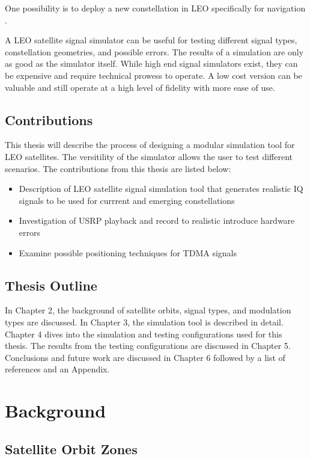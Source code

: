 \documentclass[12pt]{report}
\begin{document}
One possibility is to deploy a new constellation in LEO specifically for navigation  \cite{reidSatelliteNavigationAge2020}.


A LEO satellite signal simulator can be useful for testing different signal types, constellation geometries, and possible errors. The results of a simulation are only as good as the simulator itself. While high end signal simulators exist, they can be expensive and require technical prowess to operate. A low cost version can be valuable and still operate at a high level of fidelity with more ease of use. 

\section { Contributions}
This thesis will describe the process of designing a modular simulation tool for LEO satellites. The versitility of the simulator allows the user to test different scenarios. 
The contributions from this thesis are listed below:
\begin{itemize}
    \item Description of LEO satellite signal simulation tool that generates realistic IQ signals to be used for currrent and emerging constellations
    \item Investigation of USRP playback and record to realistic introduce hardware errors
    \item Examine possible positioning techniques for TDMA signals
    
\end{itemize}

\section{Thesis Outline}
In Chapter 2, the background of satellite orbits, signal types, and modulation types are discussed. In Chapter 3, the simulation tool is described in detail. Chapter 4 dives into the simulation and testing configurations used for this thesis. The results from the testing configurations are discussed in Chapter 5. Conclusions and future work are discussed in Chapter 6 followed by a list of references and an Appendix.


\chapter{Background}

\section{Satellite Orbit Zones}
\end{document}
